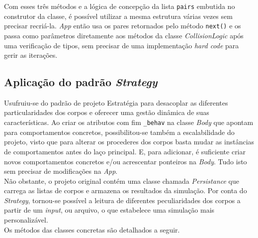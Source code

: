 \documentclass[11pt]{article}
\begin{document}
Com esses três métodos e a lógica de concepção da lista \verb|pairs| embutida no construtor da classe, é possível utilizar a mesma estrutura várias vezes sem precisar recriá-la. \textit{App} então usa os pares retornados pelo método \verb|next()| e os passa como parâmetros diretamente aos métodos da classe \textit{CollisionLogic} após uma verificação de tipos, sem precisar de uma implementação \textit{hard code} para gerir as iterações.

\subsection{Aplicação do padrão \textit{Strategy}}

Usufruiu-se do padrão de projeto Estratégia \cite{refac_guru_strategy} para desacoplar as diferentes particularidades dos corpos e oferecer uma gestão dinâmica de suas características. Ao criar os atributos com fim \verb|_behav| na classe \textit{Body} que apontam para comportamentos concretos, possibilitou-se também a escalabilidade do projeto, visto que para alterar os procederes dos corpos basta mudar as instâncias de comportamentos antes do laço principal. E, para adicionar, é suficiente criar novos comportamentos concretos e/ou acrescentar ponteiros na \textit{Body}. Tudo isto sem precisar de modificações na \textit{App}. \\

Não obstante, o projeto original contém uma classe chamada \textit{Persistance} que carrega as listas de corpos e armazena os resultados da simulação. Por conta do \textit{Strategy}, tornou-se possível a leitura de diferentes peculiaridades dos corpos a partir de um \textit{input}, ou arquivo, o que estabelece uma simulação mais personalizável. \\

Os métodos das classes concretas são detalhados a seguir.
\end{document}
